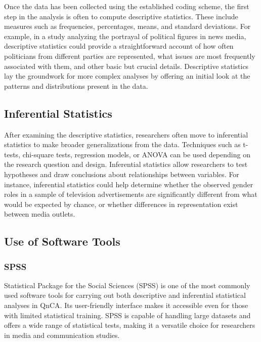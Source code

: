 \documentclass[
  b5paper]{book}
\begin{document}
Once the data has been collected using the established coding scheme, the first step in the analysis is often to compute descriptive statistics. These include measures such as frequencies, percentages, means, and standard deviations. For example, in a study analyzing the portrayal of political figures in news media, descriptive statistics could provide a straightforward account of how often politicians from different parties are represented, what issues are most frequently associated with them, and other basic but crucial details. Descriptive statistics lay the groundwork for more complex analyses by offering an initial look at the patterns and distributions present in the data.

\hypertarget{inferential-statistics}{%
\subsection*{Inferential Statistics}\label{inferential-statistics}}

After examining the descriptive statistics, researchers often move to inferential statistics to make broader generalizations from the data. Techniques such as t-tests, chi-square tests, regression models, or ANOVA can be used depending on the research question and design. Inferential statistics allow researchers to test hypotheses and draw conclusions about relationships between variables. For instance, inferential statistics could help determine whether the observed gender roles in a sample of television advertisements are significantly different from what would be expected by chance, or whether differences in representation exist between media outlets.

\hypertarget{use-of-software-tools}{%
\subsection*{Use of Software Tools}\label{use-of-software-tools}}

\hypertarget{spss}{%
\subsubsection*{SPSS}\label{spss}}

Statistical Package for the Social Sciences (SPSS) is one of the most commonly used software tools for carrying out both descriptive and inferential statistical analyses in QnCA. Its user-friendly interface makes it accessible even for those with limited statistical training. SPSS is capable of handling large datasets and offers a wide range of statistical tests, making it a versatile choice for researchers in media and communication studies.
\end{document}
